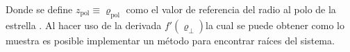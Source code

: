 Donde se define $z_{\mathrm{pol}} \equiv \varrho_{\mathrm{pol}}$ como el valor
de referencia del radio al polo de la estrella
. Al hacer uso de la derivada
$f\prime (\varrho_{\perp})$\textemdash la cual se puede obtener como lo muestra
\textemdash es posible
implementar un método para encontrar raíces del sistema. 
